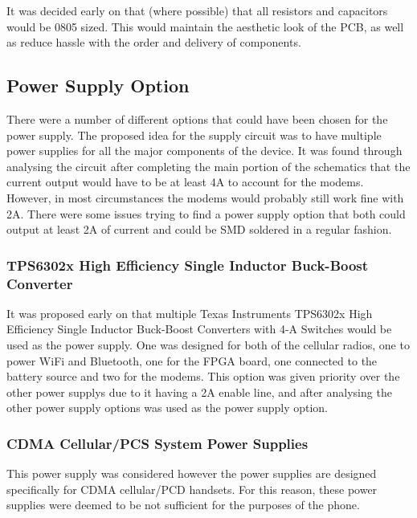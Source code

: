It was decided early on that (where possible) that all resistors and capacitors would be 0805 sized. This would maintain the aesthetic look of the PCB, as well as reduce hassle with the order and delivery of components. 


\subsection{Power Supply Option}

	There were a number of different options that could have been chosen for the power supply. The proposed idea for the supply circuit was to have multiple power supplies for all the major components of the device. It was found through analysing the circuit after completing the main portion of the schematics that the current output would have to be at least 4A to account for the modems. However, in most circumstances the modems would probably still work fine with 2A. There were some issues trying to find a power supply option that both could output at least 2A of current and could be SMD soldered in a regular fashion. 

\subsubsection{TPS6302x High Efficiency Single Inductor Buck-Boost Converter}

It was proposed early on that multiple Texas Instruments TPS6302x High Efficiency Single Inductor Buck-Boost Converters with 4-A Switches would be used as the power supply. One was designed for both of the cellular radios, one to power WiFi and Bluetooth, one for the FPGA board, one connected to the battery source and two for the modems. 
This option was given priority over the other power supplys due to it having a 2A enable line, and after analysing the other power supply options was used as the power supply option. 


\subsubsection{CDMA Cellular/PCS System Power Supplies}

This power supply was considered however the power supplies are designed specifically for CDMA cellular/PCD handsets. For this reason, these power supplies were deemed to be not sufficient for the purposes of the phone. 

